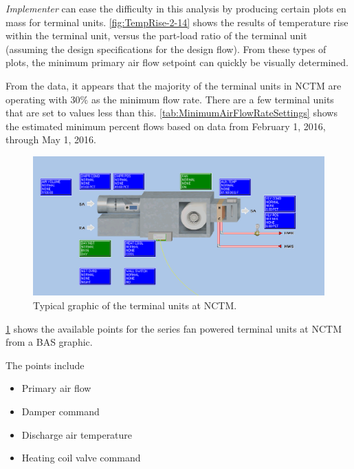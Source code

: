 \textit{Implementer} can ease the difficulty in this analysis by producing
certain plots en mass for terminal units.  \figref{} \ref{fig:TempRise-2-14}
shows the results of temperature rise within the terminal unit, versus the
part-load ratio of the terminal unit (assuming the design specifications for
the design flow). From these types of plots, the minimum primary air flow
setpoint can quickly be visually determined.

From the data, it appears that the majority of the terminal units in NCTM are
operating with 30\% as the minimum flow rate. There are a few terminal units
that are set to values less than this. \tableref{}
\ref{tab:MinimumAirFlowRateSettings} shows the estimated minimum percent flows
based on data from February 1, 2016, through May 1, 2016.  

\begin{figure}
\centering
\includegraphics[width=\linewidth]{Images/FanPoweredBoxSnip.PNG}
\caption{Typical graphic of the terminal units at NCTM.}
\label{fig:NCTMTerminalUnitGraphic}
\end{figure}

\figref{} \ref{fig:NCTMTerminalUnitGraphic} shows the available points
for the series fan powered terminal units at NCTM from a BAS graphic.

The points include
\begin{itemize}
    \item Primary air flow
    \item Damper command
    \item Discharge air temperature 
    \item Heating coil valve command
\end{itemize}






